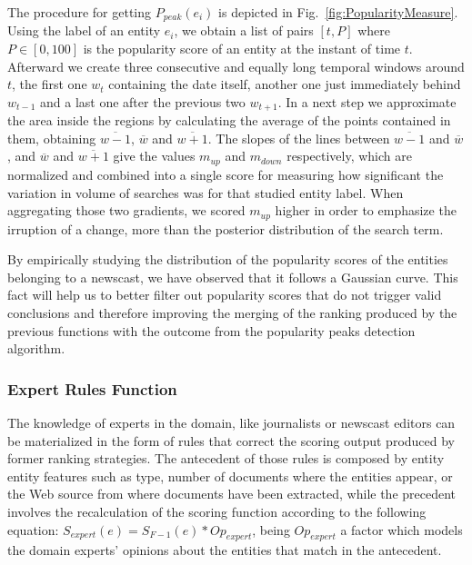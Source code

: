 \documentclass{llncs}
\newcommand{\todo}[1]{\colorbox{red}{#1}}
\begin{document}
The procedure for getting $P_{peak}(e_i)$ is depicted in Fig.~\ref{fig:PopularityMeasure}. Using the label of an entity $e_i$, we obtain a list of pairs $[t, P]$ where $P\in[0,100]$ is the popularity score of an entity at the instant of time $t$. Afterward we create three consecutive and equally long temporal windows around $t$, the first one $w_{t}$ containing the date itself, another one just immediately behind $w_{t-1}$ and a last one after the previous two $w_{t+1}$. 
In a next step we approximate the area inside the regions by calculating the average of the points contained in them, obtaining $\overline{w-1}$, $\overline{w}$ and $\overline{w+1}$. The slopes of the lines between $\overline{w-1}$ and $\overline{w}$, and $\overline{w}$ and $\overline{w+1}$ give the values $m_{up}$ and $m_{down}$ respectively, which are normalized and combined into a single score for measuring how significant the variation in volume of searches was for that studied entity label. When aggregating those two gradients, we scored $m_{up}$ higher in order to emphasize the irruption of a change, more than the posterior distribution of the search term.

By empirically studying the distribution of the popularity scores of the entities belonging to a newscast, we have observed that it follows a Gaussian curve. This fact will help us to better filter out popularity scores that do not trigger valid conclusions and therefore improving the merging of the ranking produced by the previous functions with the outcome from the popularity peaks detection algorithm. 

\subsubsection{Expert Rules Function}
The knowledge of experts in the domain, like journalists or newscast editors can be materialized in the form of rules that correct the scoring output produced by former ranking strategies. The antecedent of those rules is composed by entity entity features such as type, number of documents where the entities appear, or the Web source from where documents have been extracted, while the precedent involves the recalculation of the scoring function according to the following equation: $S_{expert}\left ( e \right ) =  S_{F-1}\left ( e \right ) *Op _{expert}$, being $Op _{expert}$ a factor which models the domain experts' opinions about the entities that match in the antecedent.
\end{document}
